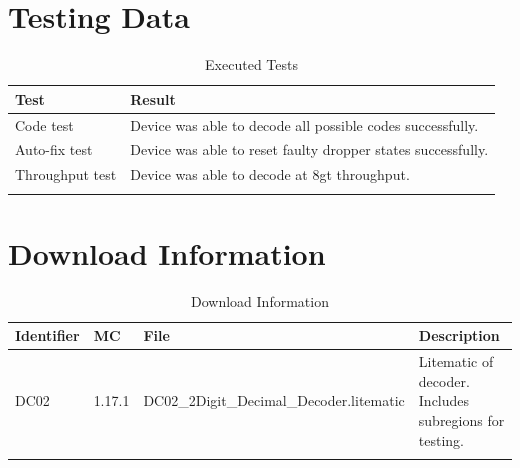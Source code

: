 \documentclass[10pt]{datasheet}
\begin{document}
\section{Testing Data}
\begin{table}[h]
\caption{Executed Tests}
\begin{tabularx}{\textwidth}{l | X}
    \thickhline
    \textbf{Test} & \textbf{Result} \\
    \hline
    Code test & Device was able to decode all possible codes successfully.\\
    \hline
    Auto-fix test & Device was able to reset faulty dropper states successfully.\\
    \hline
    Throughput test & Device was able to decode at 8gt throughput.\\
    \thickhline
\end{tabularx}
\end{table}

\section{Download Information}
\begin{table}[h]
    \caption{Download Information}
    \begin{tabularx}{\textwidth}{l | l | l | X}
        \thickhline
        \textbf{Identifier} & \textbf{MC} & \textbf{File} & \textbf{Description} \\
        \hline
        DC02 & 1.17.1 & DC02\_2Digit\_Decimal\_Decoder.litematic & Litematic of decoder. Includes subregions for testing. \\
        \thickhline
    \end{tabularx}
\end{table}
\end{document}
